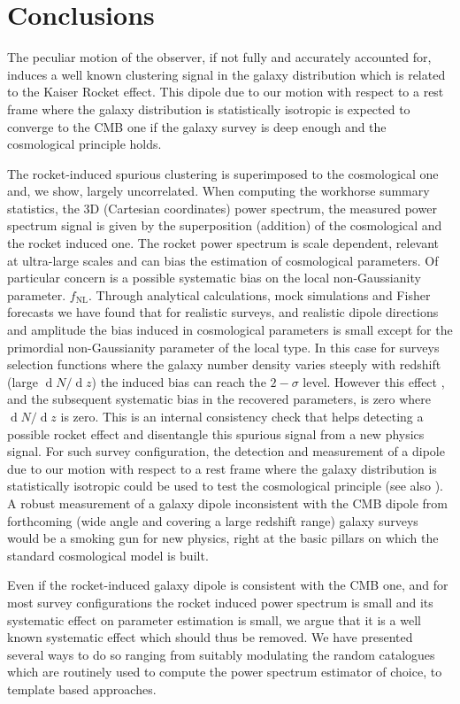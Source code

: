 \documentclass[a4paper,11pt]{article}
\renewcommand{\d}{\operatorname{d}}
\begin{document}
\section{Conclusions} 
\label{sec:conclusions}

The peculiar motion of the observer, if not fully and accurately  accounted for, induces a well known clustering signal in the galaxy distribution which is related to the Kaiser Rocket effect. This dipole due to our motion with respect to a rest frame where the galaxy distribution is statistically isotropic is expected to converge to the CMB one if the galaxy survey is deep enough and the cosmological principle holds. 

The rocket-induced  spurious clustering is superimposed to the cosmological one and, we show, largely uncorrelated. When computing the workhorse summary statistics, the  3D (Cartesian coordinates) power spectrum, the measured power spectrum signal is given by the superposition (addition) of the cosmological and the rocket induced one. The rocket power spectrum is scale dependent, relevant at ultra-large scales and can bias the estimation of cosmological parameters. Of particular concern is a possible systematic bias on the local non-Gaussianity parameter. $f_\mathrm{NL}$. Through analytical calculations, mock simulations and Fisher forecasts we have found that for  realistic surveys, and realistic dipole directions and amplitude the bias induced in cosmological parameters is small except for the primordial non-Gaussianity parameter of the local type.  In this case for surveys selection functions where the galaxy number density varies steeply with redshift (large $\d N/\d z$) the induced bias can reach the $2-\sigma$ level.  However this effect , and the subsequent systematic bias in the recovered parameters, is zero where $\d N/\d z$ is zero. This is an internal consistency check that helps detecting a possible rocket effect and disentangle this spurious signal from a new physics signal. For such survey configuration, the detection and measurement of a dipole due to our motion with respect to a rest frame where the galaxy distribution is statistically isotropic could be used to test the cosmological principle (see also \cite{Maartens:2017qoa}).  A robust measurement of a galaxy dipole inconsistent with the CMB dipole from forthcoming (wide angle and covering a large redshift range) galaxy surveys would be a smoking gun for new physics, right at the basic pillars on which the standard cosmological model is built. 

Even if the rocket-induced galaxy dipole is  consistent with the CMB one, and  for most survey configurations 
the rocket induced power spectrum is small and its  systematic effect on parameter estimation is small,  we argue that it is a well known systematic effect which should thus be removed. 
We have presented several ways to do so ranging from suitably modulating the random catalogues which are routinely used to compute the power spectrum estimator of choice, to template based approaches.
\end{document}
